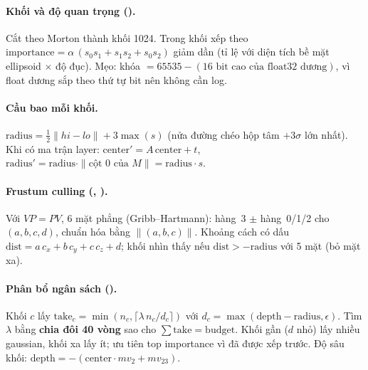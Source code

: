 \paragraph{Khối và độ quan trọng ().}
Cắt theo Morton thành khối 1024. Trong khối xếp theo $\mathrm{importance}=\alpha\,(s_0s_1+s_1s_2+s_0s_2)$ giảm dần (tỉ lệ với diện tích bề mặt ellipsoid $\times$ độ đục). Mẹo: khóa $=65535-(16\text{ bit cao của float32 dương})$, vì float dương sắp theo thứ tự bit nên không cần log.

\paragraph{Cầu bao mỗi khối.}
$\mathrm{radius}=\tfrac12\|hi-lo\|+3\max(s)$ (nửa đường chéo hộp tâm $+3\sigma$ lớn nhất). Khi có ma trận layer: $\mathrm{center}'=A\,\mathrm{center}+t$, $\mathrm{radius}'=\mathrm{radius}\cdot\|\text{cột 0 của }M\|=\mathrm{radius}\cdot s$.

\paragraph{Frustum culling (, ).}
Với $VP=PV$, 6 mặt phẳng (Gribb--Hartmann): hàng~3 $\pm$ hàng~0/1/2 cho $(a,b,c,d)$, chuẩn hóa bằng $\|(a,b,c)\|$. Khoảng cách có dấu $\mathrm{dist}=a\,c_x+b\,c_y+c\,c_z+d$; khối nhìn thấy nếu $\mathrm{dist}>-\mathrm{radius}$ với 5 mặt (bỏ mặt xa).

\paragraph{Phân bổ ngân sách ().}
Khối $c$ lấy $\mathrm{take}_c=\min(n_c,\lceil\lambda\,n_c/d_c\rceil)$ với $d_c=\max(\mathrm{depth}-\mathrm{radius},\epsilon)$. Tìm $\lambda$ bằng \textbf{chia đôi 40 vòng} sao cho $\sum\mathrm{take}=\mathrm{budget}$. Khối gần ($d$ nhỏ) lấy nhiều gaussian, khối xa lấy ít; ưu tiên top importance vì đã được xếp trước. Độ sâu khối: $\mathrm{depth}=-(\mathrm{center}\cdot mv_2+mv_{23})$.
